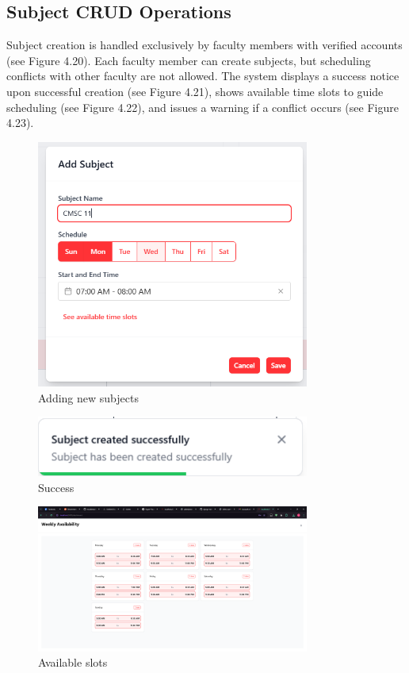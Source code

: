 \subsection{Subject CRUD Operations}
Subject creation is handled exclusively by faculty members with verified accounts (see Figure 4.20). Each faculty member can create subjects, but scheduling conflicts with other faculty are not allowed. The system displays a success notice upon successful creation (see Figure 4.21), shows available time slots to guide scheduling (see Figure 4.22), and issues a warning if a conflict occurs (see Figure 4.23).
\begin{figure}[h] %
	\centering
	\includegraphics[width=0.8\textwidth]{figures/chapter4/subject_add.png} %
	\caption{Adding new subjects}
	\label{fig:subject_add}
\end{figure}
\begin{figure}[h] %
	\centering
	\includegraphics[width=0.8\textwidth]{figures/chapter4/subject_add_success.png} %
	\caption{Success}
	\label{fig:subject_add_success}
\end{figure}
\clearpage
\begin{figure}[h] %
	\centering
	\includegraphics[width=0.8\textwidth]{figures/chapter4/subject_availability.png} %
	\caption{Available slots}
	\label{fig:subject_availability}
\end{figure}
